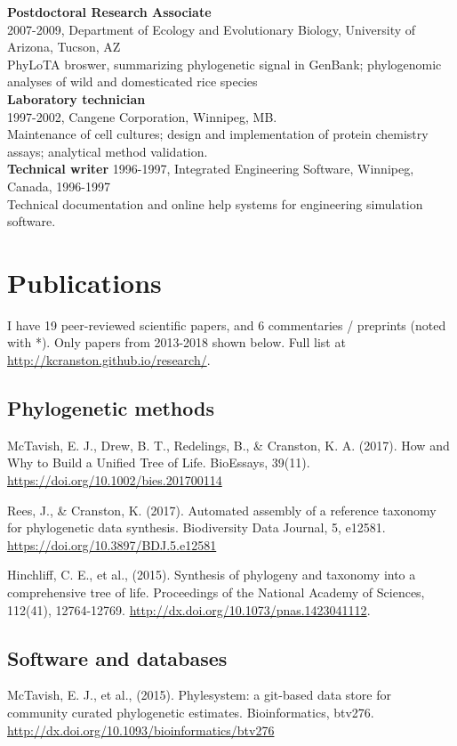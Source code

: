 \documentclass[10pt]{article}
\begin{document}
\noindent \textbf{Postdoctoral Research Associate} \\
2007-2009, Department of Ecology and Evolutionary Biology, University of Arizona, Tucson, AZ \\
PhyLoTA broswer, summarizing phylogenetic signal in GenBank; phylogenomic analyses of wild and domesticated rice species \\ 

\noindent \textbf{Laboratory technician} \\
1997-2002, Cangene Corporation, Winnipeg, MB. \\
Maintenance of cell cultures; design and implementation of protein chemistry assays; analytical method validation. \\

\noindent \textbf{Technical writer}
1996-1997, Integrated Engineering Software, Winnipeg, Canada, 1996-1997 \\
Technical documentation and online help systems for engineering simulation software. \\

\section*{Publications}

I have 19 peer-reviewed scientific papers, and 6 commentaries / preprints (noted with *). Only papers from 2013-2018 shown below. Full list at \url{http://kcranston.github.io/research/}.

\subsection*{Phylogenetic methods}
McTavish, E. J., Drew, B. T., Redelings, B., \& Cranston, K. A. (2017). How and Why to Build a Unified Tree of Life. BioEssays, 39(11). \url{https://doi.org/10.1002/bies.201700114}

Rees, J., \& Cranston, K. (2017). Automated assembly of a reference taxonomy for phylogenetic data synthesis. Biodiversity Data Journal, 5, e12581. \url{https://doi.org/10.3897/BDJ.5.e12581}

Hinchliff, C. E., et al., (2015). Synthesis of phylogeny and taxonomy into a comprehensive tree of life. Proceedings of the National Academy of Sciences, 112(41), 12764-12769. \url{http://dx.doi.org/10.1073/pnas.1423041112}. 

\subsection*{Software and databases}
McTavish, E. J., et al., (2015). Phylesystem: a git-based data store for community curated phylogenetic estimates. Bioinformatics, btv276. \url{http://dx.doi.org/10.1093/bioinformatics/btv276} 
\end{document}
